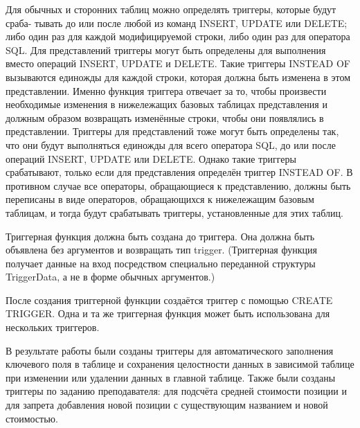 Для обычных и сторонних таблиц можно определять триггеры, которые будут сраба-
тывать до или после любой из команд INSERT, UPDATE или DELETE; либо один раз для
каждой модифицируемой строки, либо один раз для оператора SQL.
Для представлений триггеры могут быть определены для выполнения вместо операций
INSERT, UPDATE и DELETE. Такие триггеры INSTEAD OF вызываются единожды для
каждой строки, которая должна быть изменена в этом представлении. Именно функция
триггера отвечает за то, чтобы произвести необходимые изменения в нижележащих базовых таблицах представления и должным образом возвращать изменённые строки, чтобы
они появлялись в представлении. Триггеры для представлений тоже могут быть определены так, что они будут выполняться единожды для всего оператора SQL, до или после
операций INSERT, UPDATE или DELETE. Однако такие триггеры срабатывают, только
если для представления определён триггер INSTEAD OF. В противном случае все операторы, обращающиеся к представлению, должны быть переписаны в виде операторов,
обращающихся к нижележащим базовым таблицам, и тогда будут срабатывать триггеры,
установленные для этих таблиц.

Триггерная функция должна быть создана до триггера. Она должна быть объявлена без аргументов и возвращать тип trigger. (Триггерная функция получает данные на
вход посредством специально переданной структуры TriggerData, а не в форме обычных
аргументов.)

После создания триггерной функции создаётся триггер с помощью CREATE TRIGGER.
Одна и та же триггерная функция может быть использована для нескольких триггеров.

В результате работы были созданы триггеры для автоматического заполнения ключевого поля в таблице и сохранения целостности данных в зависимой таблице при изменении
или удалении данных в главной таблице. Также были созданы триггеры по заданию преподавателя: для подсчёта средней стоимости позиции и для запрета добавления новой позиции с существующим названием и новой стоимостью.

